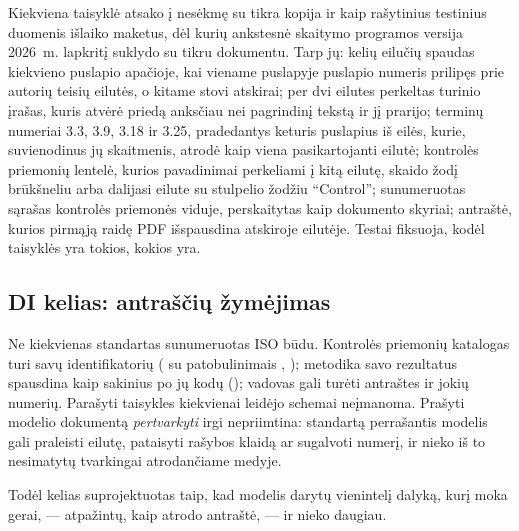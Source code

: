 \begin{lessonbox}{Kiekviena taisyklė atsako į nesėkmę su tikra kopija}
 ir  kaip rašytinius
testinius duomenis išlaiko maketus, dėl kurių ankstesnė skaitymo programos versija 2026~m.
lapkritį suklydo su tikru dokumentu. Tarp jų: kelių eilučių spaudas kiekvieno puslapio apačioje,
kai viename puslapyje puslapio numeris prilipęs prie autorių teisių eilutės, o kitame stovi
atskirai; per dvi eilutes perkeltas turinio įrašas, kuris atvėrė priedą anksčiau nei pagrindinį
tekstą ir jį prarijo; terminų numeriai 3.3, 3.9, 3.18 ir 3.25, pradedantys keturis puslapius iš
eilės, kurie, suvienodinus jų skaitmenis, atrodė kaip viena pasikartojanti eilutė; kontrolės
priemonių lentelė, kurios pavadinimai perkeliami į kitą eilutę, skaido žodį brūkšneliu arba
dalijasi eilute su stulpelio žodžiu \enquote{Control}; sunumeruotas sąrašas kontrolės
priemonės viduje, perskaitytas kaip dokumento skyriai; antraštė, kurios pirmąją raidę PDF
išspausdina atskiroje eilutėje. Testai fiksuoja, kodėl taisyklės yra tokios, kokios yra.
\end{lessonbox}

\subsection{DI kelias: antraščių žymėjimas}\label{sec:corpus:outline}

Ne kiekvienas standartas sunumeruotas ISO būdu. Kontrolės priemonių katalogas turi savų
identifikatorių ( su patobulinimais , ); metodika savo rezultatus
spausdina kaip sakinius po jų kodų (); vadovas gali turėti antraštes ir jokių
numerių. Parašyti taisykles kiekvienai leidėjo schemai neįmanoma. Prašyti modelio dokumentą
\emph{pertvarkyti} irgi nepriimtina: standartą perrašantis modelis gali praleisti eilutę,
pataisyti rašybos klaidą ar sugalvoti numerį, ir nieko iš to nesimatytų tvarkingai
atrodančiame medyje.

Todėl kelias suprojektuotas taip, kad modelis darytų vienintelį dalyką, kurį moka gerai, ---
atpažintų, kaip atrodo antraštė, --- ir nieko daugiau.

